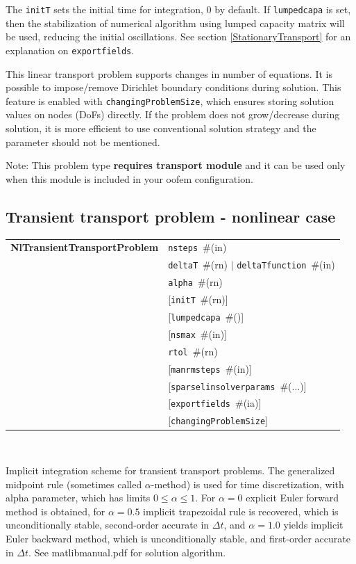 \documentclass[a4paper]{article}
\makeatletter
\newcommand{\param}[1]{\texttt{#1}} %
\newcommand{\optional}[1]{[#1]} %
\newcommand{\field}[2]{\param{#1}~\#{\tiny(#2)}} %
\newcommand{\optField}[2]{\optional{\field{#1}{#2}}}
\newcommand{\optFieldnotype}[1]{[\param{#1}]}
\newcommand{\entKeywordInst}[1]{\textbf{#1}} %
\newenvironment{record}[1][]{\begin{tabular}{|ll}}{\end{tabular}\\}
\newcommand{\recentry}[2]{{#1}&{#2}\\}
\newcounter{rcc}
\newenvironment{record}[1][\textwidth]{\setcounter{rcc}{0}\begin{tabular*}{#1}{|ll@{\extracolsep{\fill}}r}}{\end{tabular*}\\}
\newcommand{\recentry}[2]{\ifthenelse{\value{rcc}>0}{&$\backslash$ \\}{\setcounter{rcc}{1}}{#1}&{#2}}
\makeatother
\begin{document}
The \param{initT} sets the initial time for integration, 0 by default.
If \param{lumpedcapa} is set, then the stabilization of numerical
algorithm using lumped capacity matrix will be used, reducing the
initial oscillations.
See section \ref{StationaryTransport} for an explanation on
\param{exportfields}.

This linear transport problem supports changes in number of equations. It is possible to impose/remove
Dirichlet boundary conditions during solution. This feature is enabled with \param{changingProblemSize}, which ensures
storing solution values on nodes (DoFs) directly. If the problem does not grow/decrease during solution, it is more efficient
to use conventional solution strategy and the parameter should not be mentioned.

Note: This problem type \textbf{requires transport module} and it
can be used only when this module is included in your oofem
configuration.

\subsection{Transient transport problem - nonlinear case}
\label{TransientTransport}

\begin{record}
  \recentry{\entKeywordInst{NlTransientTransportProblem}}{\field{nsteps}{in}}
  \recentry{}{\field{deltaT}{rn} $|$  \field{deltaTfunction}{in}}
  \recentry{}{\field{alpha}{rn}}
  \recentry{}{\optField{initT}{rn}}
  \recentry{}{\optField{lumpedcapa}{}}
  \recentry{}{\optField{nsmax}{in}}
  \recentry{}{\field{rtol}{rn}}
  \recentry{}{\optField{manrmsteps}{in}}
  \recentry{}{\optField{sparselinsolverparams}{...}}
  \recentry{}{\optField{exportfields}{ia}}
  \recentry{}{\optFieldnotype{changingProblemSize}}
\end{record}

Implicit integration scheme for transient transport problems. The generalized
midpoint rule (sometimes called $\alpha$-method) is used for time discretization, with alpha parameter,
which has limits $0\le\alpha\le1$. For $\alpha=0$ explicit Euler
forward method is obtained, for $\alpha=0.5$ implicit trapezoidal rule
is recovered, which is unconditionally stable, second-order accurate
in $\Delta t$, and $\alpha=1.0$ yields implicit Euler backward method,
which is unconditionally stable, and first-order accurate
in $\Delta t$. See matlibmanual.pdf for solution algorithm.
\end{document}
